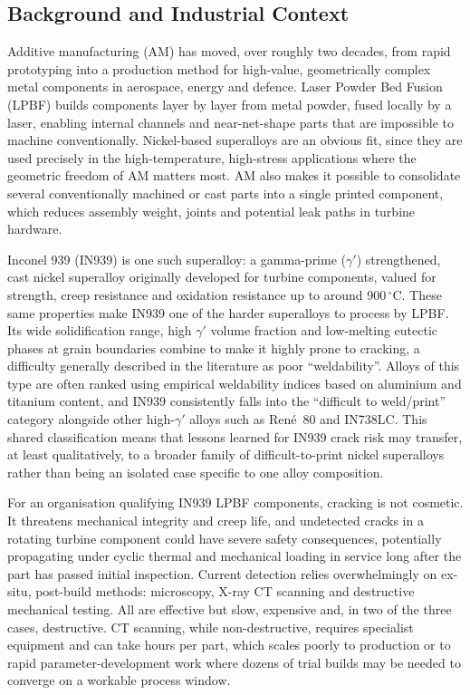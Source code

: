 \documentclass[a4paper]{article}
\begin{document}
\subsection{Background and Industrial Context}
Additive manufacturing (AM) has moved, over roughly two decades, from rapid prototyping into a production method for high-value, geometrically complex metal components in aerospace, energy and defence. Laser Powder Bed Fusion (LPBF) builds components layer by layer from metal powder, fused locally by a laser, enabling internal channels and near-net-shape parts that are impossible to machine conventionally. Nickel-based superalloys are an obvious fit, since they are used precisely in the high-temperature, high-stress applications where the geometric freedom of AM matters most. AM also makes it possible to consolidate several conventionally machined or cast parts into a single printed component, which reduces assembly weight, joints and potential leak paths in turbine hardware.

Inconel 939 (IN939) is one such superalloy: a gamma-prime ($\gamma'$) strengthened, cast nickel superalloy originally developed for turbine components, valued for strength, creep resistance and oxidation resistance up to around 900\,$^\circ$C. These same properties make IN939 one of the harder superalloys to process by LPBF. Its wide solidification range, high $\gamma'$ volume fraction and low-melting eutectic phases at grain boundaries combine to make it highly prone to cracking, a difficulty generally described in the literature as poor ``weldability''. Alloys of this type are often ranked using empirical weldability indices based on aluminium and titanium content, and IN939 consistently falls into the ``difficult to weld/print'' category alongside other high-$\gamma'$ alloys such as Ren\'e~80 and IN738LC. This shared classification means that lessons learned for IN939 crack risk may transfer, at least qualitatively, to a broader family of difficult-to-print nickel superalloys rather than being an isolated case specific to one alloy composition.

For an organisation qualifying IN939 LPBF components, cracking is not cosmetic. It threatens mechanical integrity and creep life, and undetected cracks in a rotating turbine component could have severe safety consequences, potentially propagating under cyclic thermal and mechanical loading in service long after the part has passed initial inspection. Current detection relies overwhelmingly on ex-situ, post-build methods: microscopy, X-ray CT scanning and destructive mechanical testing. All are effective but slow, expensive and, in two of the three cases, destructive. CT scanning, while non-destructive, requires specialist equipment and can take hours per part, which scales poorly to production or to rapid parameter-development work where dozens of trial builds may be needed to converge on a workable process window.
\end{document}

